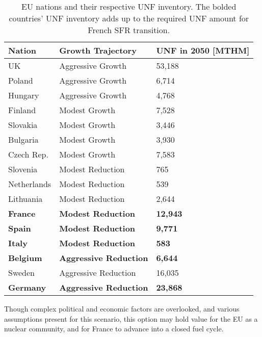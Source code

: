 \begin{table}[h]
    \centering
                \begin{tabularx}{\textwidth}{lbb}
                       \hline 
                    
                    \textbf{Nation} & \textbf{Growth Trajectory} & \small{\textbf{UNF in 2050 [MTHM] }}\\
                    \hline
                    UK & Aggressive Growth & 53,188\\
                    \hline
                    Poland & Aggressive Growth & 6,714\\
                    \hline
                    Hungary & Aggressive Growth & 4,768 \\ 
                    \hline
                    Finland & Modest Growth &  7,528\\
                    \hline
                    Slovakia & Modest Growth & 3,446\\
                    \hline
                    Bulgaria & Modest Growth & 3,930 \\
                    \hline
                    Czech Rep. & Modest Growth & 7,583\\
                    \hline
                    Slovenia & Modest Reduction & 765\\
                    \hline
                    Netherlands & Modest Reduction & 539\\
                    \hline
                    Lithuania & Modest Reduction & 2,644 \\
                    \hline
                    \textbf{France} & \textbf{Modest Reduction} & \textbf{12,943} \\
                    \hline 
                    \textbf{Spain} & \textbf{Modest Reduction} &  \textbf{9,771} \\
                    \hline
                    \textbf{Italy} & \textbf{Modest Reduction} & \textbf{583}\\
                    \hline
                    \textbf{Belgium} & \textbf{Aggressive Reduction} & \textbf{6,644}\\
                    \hline
                    Sweden & Aggressive Reduction & 16,035\\
                    \hline
                    \textbf{Germany} & \textbf{Aggressive Reduction} & \textbf{23,868}\\
                    \hline
                \end{tabularx}
    \caption {\gls{EU} nations and their respective \gls{UNF} inventory. The bolded countries'
              \gls{UNF} inventory adds up to the required \gls{UNF} amount for French \gls{SFR} transition. }
    \label{tab:which_send}

\end{table}

Though complex political and economic factors are overlooked,
 and various assumptions present for this scenario,
this option may hold value for the \gls{EU} as a nuclear community,
and for France to advance into a closed fuel cycle.
